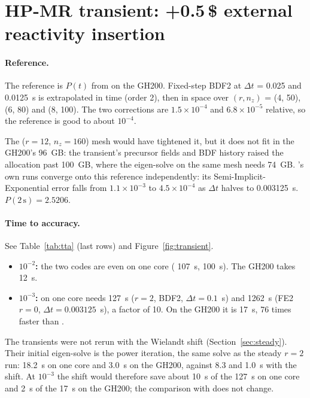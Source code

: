 \section{HP-MR transient: +0.5\,\$ external reactivity insertion}
\label{sec:transient}

\paragraph{Reference.} The reference is $P(t)$ from \garnet{} on the GH200.
Fixed-step BDF2 at $\Delta t$ = 0.025 and 0.0125~s is extrapolated in time
(order 2), then in space over $(r, n_z)$ = (4, 50), (6, 80) and (8, 100). The
two corrections are $1.5 \times 10^{-4}$ and $6.8 \times 10^{-5}$ relative,
so the reference is good to about $10^{-4}$.

The ($r=12$, $n_z=160$) mesh would have tightened it, but it does not fit in
the GH200's 96~GB: the transient's precursor fields and BDF history raised
the allocation past 100~GB, where the eigen-solve on the same mesh needs
74~GB. \ffn's own runs converge onto this reference independently: its
Semi-Implicit-Exponential error falls from $1.1 \times 10^{-3}$ to
$4.5 \times 10^{-4}$ as $\Delta t$ halves to 0.003125~s. $P(2\,\mathrm{s}) =
2.5206$.

\paragraph{Time to accuracy.} See Table~\ref{tab:tta} (last rows) and
Figure~\ref{fig:transient}.
\begin{itemize}
\item \textbf{$10^{-2}$:} the two codes are even on one core (\ffn{} 107~s,
  \garnet{} 100~s). The GH200 takes 12~s.
\item \textbf{$10^{-3}$:} \garnet{} on one core needs 127~s ($r=2$, BDF2,
  $\Delta t = 0.1$~s) and \ffn{} 1262~s (FE2 $r=0$, $\Delta t = 0.003125$~s),
  a factor of 10. On the GH200 it is 17~s, 76 times faster than \ffn.
\end{itemize}

The \garnet{} transients were not rerun with the Wielandt shift
(Section~\ref{sec:steady}). Their initial eigen-solve is the power iteration,
the same solve as the steady $r=2$ run: 18.2~s on one core and 3.0~s on the
GH200, against 8.3 and 1.0~s with the shift. At $10^{-3}$ the shift would
therefore save about 10~s of the 127~s on one core and 2~s of the 17~s on the
GH200; the comparison with \ffn{} does not change.


